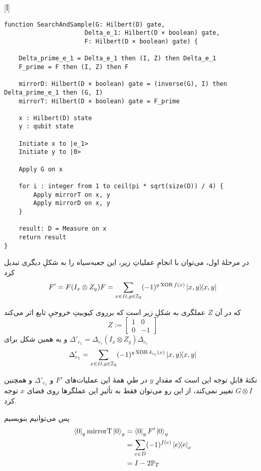 [آ]
\begin{latin}
\begin{lstlisting}
function SearchAndSample(G: Hilbert(D) gate, 
                      Delta_e_1: Hilbert(D × boolean) gate,
                      F: Hilbert(D × boolean) gate) {

    Delta_prime_e_1 = Delta_e_1 then (I, Z) then Delta_e_1
    F_prime = F then (I, Z) then F

    mirrorD: Hilbert(D × boolean) gate = (inverse(G), I) then Delta_prime_e_1 then (G, I)
    mirrorT: Hilbert(D × boolean) gate = F_prime

    x : Hilbert(D) state
    y : qubit state

    Initiate x to |e_1>
    Initiate y to |0>

    Apply G on x
    
    for i : integer from 1 to ceil(pi * sqrt(size(D)) / 4) {
        Apply mirrorT on x, y
        Apply mirrorD on x, y
    }

    result: D = Measure on x
    return result
}
\end{lstlisting}
\end{latin}

در مرحلهٔ اول، می‌توان با انجامِ عملیاتِ زیر، این جعبه‌سیاه را به شکلِ دیگری تبدیل کرد
\begin{equation}
    F' = F (I_x \otimes Z_y) F = \sum_{x \in D, y \in \mathbb{Z}_2} (-1)^{y \XOR f(x)}\dyad{x, y}{x, y}
\end{equation}

که در آن $Z$ عملگری به شکلِ زیر است که برروی کیوبیتِ خروجیِ تابع اثر می‌کند
\begin{equation}
    Z := \begin{bmatrix}
    1 & 0 \\
    0 & -1
\end{bmatrix}
\end{equation}
و به همین شکل برای 
$\Delta'_{e_1} = \Delta_{e_1} (I_x \otimes Z_y) \Delta_{e_1}$
\begin{equation}
    \Delta'_{e_1} = \sum_{x \in D, y \in \mathbb{Z}_2} (-1)^{y \XOR \delta_{e_1}(x)}\dyad{x, y}{x, y}
\end{equation}

نکتهٔ قابلِ توجه این است که مقدارِ $y$ در طیِ همهٔ این عملیات‌های $F'$ و $\Delta'_{e_1}$ و همچنین $G \otimes I$ تغییر نمی‌کند، از این رو می‌توان فقط به تأثیرِ این عملگرها روی فضای $x$ توجه کرد.

پس می‌توانیم بنویسیم
\begin{align}
    \bra{0}_y \mathrm{mirrorT} \ket{0}_y &= \bra{0}_y F' \ket{0}_y \\ 
    &= \sum_{e \in D} (-1)^{f(e)}\dyad{e}_x \\
    &= I - 2\mathbb{P}_T
\end{align}


